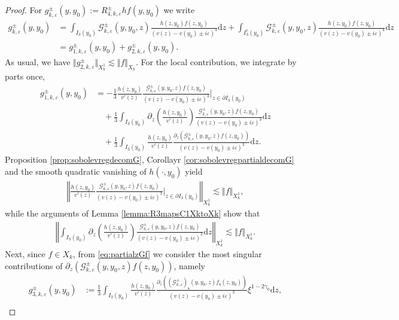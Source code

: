 \documentclass[11pt,reqno]{amsproc}
\theoremstyle{definition}
\numberwithin{equation}{section}
\newcommand{\G}{{\mathcal{G}}}
\newcommand{\s}{{\mathsf{s}}}
\renewcommand{\d}{\mathrm{d}}
\newcommand{\ep}{\varepsilon}
\begin{document}
\begin{proof}
For $g_{k,\ep}^\pm(y,y_0):= R_{4,k,\ep}^\pm hf(y,y_0)$ we write
\begin{align*}
g_{k,\ep}^\pm(y,y_0) &= \int_{I_3(y_0)}\G_{k,\ep}^\pm(y,y_0,z)\frac{h(z,y_0)f(z,y_0)}{(v(z) - v(y_0) \pm i\ep)^4} \d z + \int_{I_3^c(y_0)}\G_{k,\ep}^\pm(y,y_0,z)\frac{h(z,y_0)f(z,y_0)}{(v(z) - v(y_0) \pm i\ep)^4} \d z \\
&= g_{1,k,\ep}^\pm(y,y_0) + g_{2,k,\ep}^\pm(y,y_0). 
\end{align*}
As usual, we have $\Vert g_{2,k,\ep}^\pm \Vert_{X_k^1} \lesssim \Vert f \Vert_{X_k}$. For the local contribution, we integrate by parts once,
\begin{align*}
g_{1,k,\ep}^\pm(y,y_0) &= -\frac13 \frac{h(z,y_0)}{v'(z)}\frac{\G_{k,\ep}^\pm(y,y_0,z)f(z,y_0)}{(v(z) - v(y_0) \pm i\ep)^3} \Big|_{z\in \partial I_3(y_0)} \\
& \quad + \frac13 \int_{I_3(y_0)} \partial_z \left( \frac{h(z,y_0)}{v'(z)} \right) \frac{\G_{k,\ep}^\pm(y,y_0,z)f(z,y_0)}{(v(z) - v(y_0) \pm i\ep)^3} \d z \\
&\quad +\frac13 \int_{I_3(y_0)} \frac{h(z,y_0)}{v'(z)}  \frac{\partial_z \left(\G_{k,\ep}^\pm(y,y_0,z)f(z,y_0)\right)}{(v(z) - v(y_0) \pm i\ep)^3} \d z.
\end{align*}
Proposition \ref{prop:sobolevregdecomG}, Corollayr \ref{cor:sobolevregpartialdecomG} and the smooth quadratic vanishing of $h(\cdot,y_0)$ yield
\begin{align*}
\left \Vert \frac{h(z,y_0)}{v'(z)}\frac{\G_{k,\ep}^\pm(y,y_0,z)f(z,y_0)}{(v(z) - v(y_0) \pm i\ep)^3} \Big|_{z\in \partial I_3(y_0)} \right\Vert_{X_k^1} \lesssim \Vert f \Vert_{X_k^1},
\end{align*}
while the arguments of Lemma \ref{lemma:R3mapsC1XktoXk} show that
\begin{align*}
\left\Vert \int_{I_3(y_0)} \partial_z \left( \frac{h(z,y_0)}{v'(z)} \right) \frac{\G_{k,\ep}^\pm(y,y_0,z)f(z,y_0)}{(v(z) - v(y_0) \pm i\ep)^3} \d z \right\Vert_{X_k^1}\lesssim \Vert f \Vert_{X_k^1}.
\end{align*}
Next, since $f\in X_k$, from \eqref{eq:partialzGf} we consider the most singular contributions of $\partial_z \left( \G_{k,\ep}^\pm(y,y_0,z) f(z,y_0)\right)$, namely
\begin{align*}
g_{3,k,\ep}^\pm(y,y_0) &:= \frac13\int_{I_3(y_0)} \frac{h(z,y_0)}{v'(z)}  \frac{\partial_z \left( \left(\G_{k,\ep}^\pm\right)_\s(y,y_0,z)f_\s(z,y_0)\right)}{(v(z) - v(y_0) \pm i\ep)^3}\xi^{1-2\gamma_0} \d z, \\

\end{align*}
\end{proof}
\end{document}
